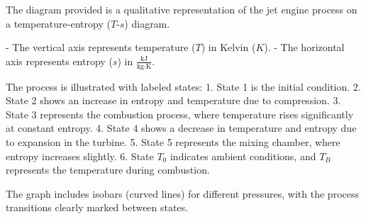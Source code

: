 The diagram provided is a qualitative representation of the jet engine process on a temperature-entropy (\( T \)-\( s \)) diagram.  

- The vertical axis represents temperature (\( T \)) in Kelvin (\( K \)).  
- The horizontal axis represents entropy (\( s \)) in \( \frac{\text{kJ}}{\text{kg·K}} \).  

The process is illustrated with labeled states:  
1. State 1 is the initial condition.  
2. State 2 shows an increase in entropy and temperature due to compression.  
3. State 3 represents the combustion process, where temperature rises significantly at constant entropy.  
4. State 4 shows a decrease in temperature and entropy due to expansion in the turbine.  
5. State 5 represents the mixing chamber, where entropy increases slightly.  
6. State \( T_0 \) indicates ambient conditions, and \( T_B \) represents the temperature during combustion.  

The graph includes isobars (curved lines) for different pressures, with the process transitions clearly marked between states.